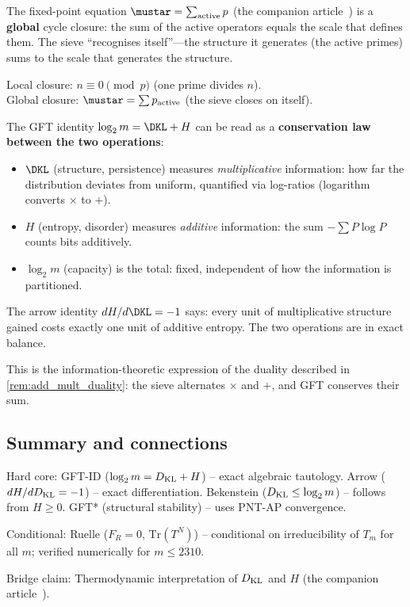 \documentclass[12pt,a4paper]{article}
\begin{document}
\begin{remark}
\label{rem:global_closure}
The fixed-point equation $\mustar = \sum_{\mathrm{active}} p$
(the companion article~\cite{companion_M3}) is a \textbf{global} cycle closure:
the sum of the active operators equals the scale that defines them.
The sieve ``recognises itself''---the structure it generates
(the active primes) sums to the scale that generates the structure.

Local closure: $n \equiv 0 \pmod{p}$ (one prime divides $n$).\\
Global closure: $\mustar = \sum p_{\rm active}$ (the sieve closes on itself).
\end{remark}

\begin{remark}
\label{rem:gft_add_mult}
The GFT identity $\log_2 m = \DKL + H$ can be read as a
\textbf{conservation law between the two operations}:
\begin{itemize}[nosep]
\item $\DKL$ (structure, persistence) measures
  \emph{multiplicative} information: how far the distribution
  deviates from uniform, quantified via log-ratios (logarithm
  converts $\times$ to $+$).
\item $H$ (entropy, disorder) measures \emph{additive}
  information: the sum $-\sum P \log P$ counts bits
  additively.
\item $\log_2 m$ (capacity) is the total: fixed, independent
  of how the information is partitioned.
\end{itemize}
The arrow identity $dH/d\DKL = -1$ says:
every unit of multiplicative structure gained costs exactly one
unit of additive entropy.  The two operations are in exact
balance.

This is the information-theoretic expression of the duality
described in \cref{rem:add_mult_duality}: the sieve
alternates $\times$ and $+$, and GFT conserves their sum.
\end{remark}

\subsection{Summary and connections}
\label{sec:ch4_summary}

\begin{ledgerbox}
Hard core:
  GFT-ID ($\log_2 m = D_{\rm KL} + H$) -- exact algebraic tautology.
  Arrow ($dH/dD_{\rm KL} = -1$) -- exact differentiation.
  Bekenstein ($D_{\rm KL} \leq \log_2 m$) -- follows from $H \geq 0$.
  GFT* (structural stability) -- uses PNT-AP convergence.

Conditional:
  Ruelle ($F_R = 0$, $\mathrm{Tr}(T^N)$) -- conditional on irreducibility
  of $T_m$ for all $m$; verified numerically for $m \leq 2310$.

Bridge claim:
  Thermodynamic interpretation of $D_{\rm KL}$ and $H$ (the companion article~\cite{companion_M5}).
\end{ledgerbox}
\end{document}
